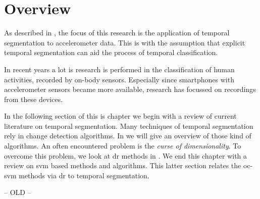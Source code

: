 \section{Overview}\label{sec:literature_review_overview}
As described in , the focus of this research is the application of temporal segmentation to accelerometer data.
This is with the assumption that explicit temporal segmentation can aid the process of temporal classification.


In recent years a lot is research is performed in the classification of human activities, recorded by on-body sensors.
Especially since smartphones with accelerometer sensors became more available, research has focussed on recordings from these devices.


In the following section of this is chapter we begin with a review of current literature on temporal segmentation.
Many techniques of temporal segmentation rely in change detection algorithms.
In  we will give an overview of those kind of algorithms.
An often encountered problem is the \emph{curse of dimensionality}.
To overcome this problem, we look at \gls{dr} methods in .
We end this chapter with a review on \gls{svm} based methods and algorithms.
This latter section relates the \gls{oc-svm} methods via \gls{dr} to temporal segmentation.








-- OLD --







